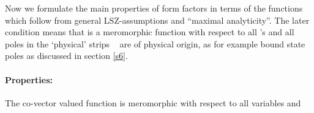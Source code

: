 \documentclass[a4paper,a4paper]{article}
\begin{document}
Now we formulate the main properties of form factors in terms of the
functions \coordHE{} which follow from
general LSZ-assumptions and ``maximal analyticity''. The later condition
means that \coordHE{} is a meromorphic
function with respect to all \myHighlight{$\theta $}\coordHE{}'s and all poles in the `physical'
strips \coordHE{}~\coordHE{} are of physical origin, as for example bound state
poles as discussed in section \ref{s6}.

\paragraph{\textbf{Properties:\label{pf}}}

The co-vector valued function \coordHE{}
is meromorphic with respect to all variables \coordHE{}
and
\end{document}
